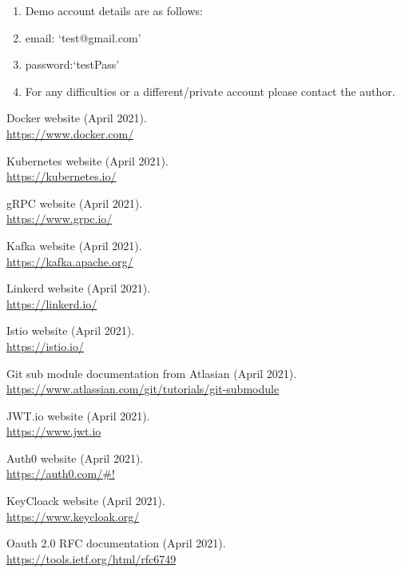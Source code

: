 \documentclass{article}
\begin{document}
\begin{multicols}{2}
\begin{enumerate}
    \begin{enumerate}
      \item Demo account details are as follows:\\
      \item email: `test@gmail.com'\\
      \item password:`testPass'\\
      \item For any difficulties or a different/private account please contact the author.
    \end{enumerate}
\end{enumerate}

\newpage
\begin{thebibliography}{9}

  Docker website (April 2021).\\
  \url{https://www.docker.com/}

  Kubernetes website (April 2021).\\
  \url{https://kubernetes.io/}

  gRPC website (April 2021).\\
  \url{https://www.grpc.io/}

  Kafka website (April 2021).\\
  \url{https://kafka.apache.org/}

  Linkerd website (April 2021).\\
  \url{https://linkerd.io/}

  Istio website (April 2021).\\
  \url{https://istio.io/}
  
  Git sub module documentation from Atlasian (April 2021).\\
  \url{https://www.atlassian.com/git/tutorials/git-submodule}
 
  JWT.io website (April 2021).\\
  \url{https://www.jwt.io}

  Auth0 website (April 2021).\\
  \url{https://auth0.com/#!}

  KeyCloack website (April 2021).\\
  \url{https://www.keycloak.org/}

  Oauth 2.0 RFC documentation (April 2021).\\
  \url{https://tools.ietf.org/html/rfc6749}


\end{thebibliography}
\end{multicols}
\end{document}
